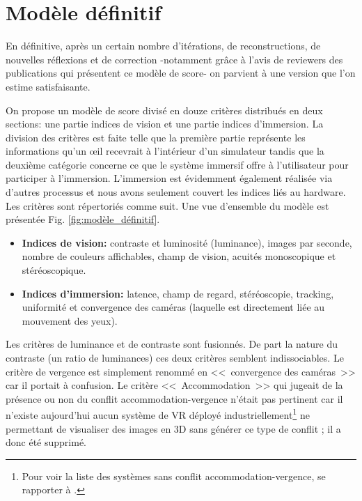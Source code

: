	\section{Modèle définitif}		
	\par En définitive, après un certain nombre d'itérations, de reconstructions, de nouvelles réflexions et de correction -notamment grâce à l'avis de reviewers des publications qui présentent ce modèle de score- on parvient à une version que l'on estime satisfaisante.
	
	\par On propose un modèle de score divisé en douze critères distribués en deux sections: une partie indices de vision et une partie indices d'immersion. La division des critères est faite telle que la première partie représente les informations qu'un œil recevrait à l'intérieur d'un simulateur tandis que la deuxième catégorie concerne ce que le système immersif offre à l'utilisateur pour participer à l'immersion. L'immersion est évidemment également réalisée via d'autres processus et nous avons seulement couvert les indices liés au hardware. Les critères sont répertoriés comme suit. Une vue d'ensemble du modèle est présentée Fig. \ref{fig:modèle_définitif}.
	
	\begin{itemize}\itemsep12pt
		\item \textbf{Indices de vision:} contraste et luminosité (luminance), images par seconde, nombre de couleurs affichables, champ de vision, acuités monoscopique et stéréoscopique.
		\item \textbf{Indices d'immersion:} latence, champ de regard, stéréoscopie, tracking, uniformité et convergence des caméras (laquelle est directement liée au mouvement des yeux).
	\end{itemize}
	
	\par Les critères de luminance et de contraste sont fusionnés. De part la nature du contraste (un ratio de luminances) ces deux critères semblent indissociables. Le critère de vergence est simplement renommé en <<~convergence des caméras~>> car il portait à confusion. Le critère <<~Accommodation~>> qui jugeait de la présence ou non du conflit accommodation-vergence n'était pas pertinent car il n'existe aujourd'hui aucun système de VR déployé industriellement\footnote{Pour voir la liste des systèmes sans conflit accommodation-vergence, se rapporter à \citep{mehrabi_making_2013}.} ne permettant de visualiser des images en 3D sans générer ce type de conflit ; il a donc été supprimé.
	
